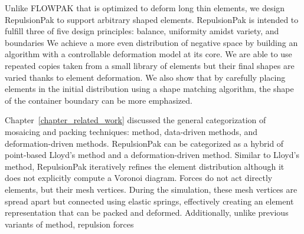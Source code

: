 \newtext
{
Unlike FLOWPAK that is optimized to deform long thin elements, 
we design RepulsionPak to support arbitrary shaped elements.
RepulsionPak is intended to fulfill three of five design principles:
balance, uniformity amidst variety, and boundaries  
We achieve a more even distribution of negative space by building an algorithm with a controllable deformation model at its core. 
We are able to use repeated copies taken from a small library of elements 
but their final shapes are varied thanks to element deformation.
We also show that by carefully placing elements in the initial distribution using a shape matching algorithm, 
the shape of the container boundary can be more emphasized.
}

\newtext
{
Chapter~\ref{chapter_related_work} discussed the general categorization of mosaicing and packing techniques: 
 method, data-driven methods, and deformation-driven methods.
RepulsionPak can be categorized as a hybrid of point-based Lloyd's method and a deformation-driven method.
Similar to Lloyd's method, RepulsionPak iteratively refines the element distribution although it does not explicitly compute a Voronoi diagram.
Forces do not act directly  elements, but their mesh vertices.
During the simulation, these mesh vertices are spread apart but  connected using elastic springs,
effectively creating an element representation that can be packed and deformed.
Additionally, unlike previous variants of  method, 
repulsion forces  
}





